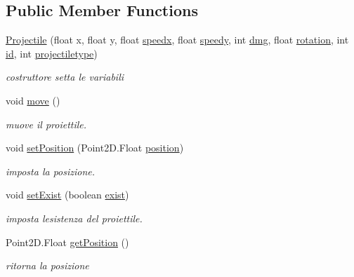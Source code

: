 \subsection*{Public Member Functions}
\begin{DoxyCompactItemize}
\item 
\hyperlink{classobjects_1_1_projectile_abfa5bb3317d35bef6eb884c6ffcce18e}{Projectile} (float x, float y, float \hyperlink{classobjects_1_1_projectile_a0e51383ba2b26548a0200e855f459416}{speedx}, float \hyperlink{classobjects_1_1_projectile_a13c57b666f056b5cae3bf6663337792c}{speedy}, int \hyperlink{classobjects_1_1_projectile_aae5cd11bae27cb7df8bca2fd5fee775e}{dmg}, float \hyperlink{classobjects_1_1_projectile_a1fc5a0e5fca1a310e6bfa125bf80042e}{rotation}, int \hyperlink{classobjects_1_1_projectile_a7441ef0865bcb3db9b8064dd7375c1ea}{id}, int \hyperlink{classobjects_1_1_projectile_a73505b2eeec69d02880a87f09d4ed6e8}{projectiletype})
\begin{DoxyCompactList}\small\item\em costruttore setta le variabili \end{DoxyCompactList}\item 
void \hyperlink{classobjects_1_1_projectile_a68c0b61b84e4e095b6463cadc275adae}{move} ()
\begin{DoxyCompactList}\small\item\em muove il proiettile. \end{DoxyCompactList}\item 
void \hyperlink{classobjects_1_1_projectile_a6dd2c1eb5e331c3fbb13d38a440303ba}{set\+Position} (Point2\+D.\+Float \hyperlink{classobjects_1_1_projectile_a9d76f6b9dbafc222b1d4ac8a6b1d4894}{position})
\begin{DoxyCompactList}\small\item\em imposta la posizione. \end{DoxyCompactList}\item 
void \hyperlink{classobjects_1_1_projectile_afa3243732c07b4447e665ddede58e3d0}{set\+Exist} (boolean \hyperlink{classobjects_1_1_projectile_a8222e0b6d4ce0639cf85b9bc508fab80}{exist})
\begin{DoxyCompactList}\small\item\em imposta l\textquotesingle{}esistenza del proiettile. \end{DoxyCompactList}\item 
Point2\+D.\+Float \hyperlink{classobjects_1_1_projectile_a6b73c36e7bd98fd9cfbffa2ff11cc10e}{get\+Position} ()
\begin{DoxyCompactList}\small\item\em ritorna la posizione \end{DoxyCompactList}\item 

\end{DoxyCompactItemize}
